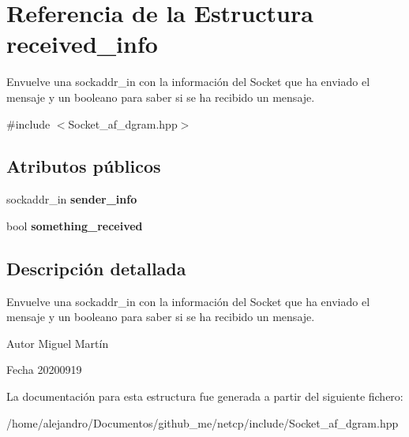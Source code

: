 \hypertarget{structreceived__info}{}\section{Referencia de la Estructura received\+\_\+info}
\label{structreceived__info}


Envuelve una sockaddr\+\_\+in con la información del Socket que ha enviado el mensaje y un booleano para saber si se ha recibido un mensaje.  




{\ttfamily \#include $<$Socket\+\_\+af\+\_\+dgram.\+hpp$>$}

\subsection*{Atributos públicos}
\begin{DoxyCompactItemize}
\item 
\mbox{\label{structreceived__info_aab4b72269198ea625744de39aad80ea5}} 
sockaddr\+\_\+in {\bfseries sender\+\_\+info}
\item 
\mbox{\label{structreceived__info_a7bedef8fd0ed79462fc64fcc69c774f8}} 
bool {\bfseries something\+\_\+received}
\end{DoxyCompactItemize}


\subsection{Descripción detallada}
Envuelve una sockaddr\+\_\+in con la información del Socket que ha enviado el mensaje y un booleano para saber si se ha recibido un mensaje. 

\begin{DoxyAuthor}{Autor}
Miguel Martín 
\end{DoxyAuthor}
\begin{DoxyDate}{Fecha}
20200919 
\end{DoxyDate}


La documentación para esta estructura fue generada a partir del siguiente fichero\+:\begin{DoxyCompactItemize}
\item 
/home/alejandro/\+Documentos/github\+\_\+me/netcp/include/Socket\+\_\+af\+\_\+dgram.\+hpp\end{DoxyCompactItemize}
